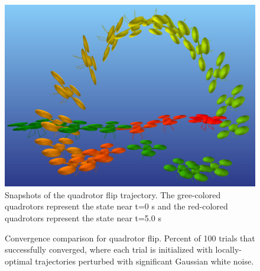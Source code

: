 \documentclass[letterpaper, 10 pt, conference]{ieeeconf}  %
\begin{document}
        \begin{figure}[t]
            \centering
            \includegraphics[width=\columnwidth]{figures/quadflip.png}
            \caption{Snapshots of the quadrotor flip trajectory. The
                gree-colored quadrotors represent the state near t=0 s and the
                red-colored quadrotors represent the state near t=5.0 s
            }
            \label{fig:quad_flip}
        \end{figure}

        \begin{figure}
            \centering    
            \caption{Convergence comparison for quadrotor flip. Percent of 100 trials 
            that successfully converged, where each trial is initialized with locally-optimal
            trajectories perturbed with significant Gaussian white noise.}
            \label{fig:flip_success}
        \end{figure}
\end{document}

